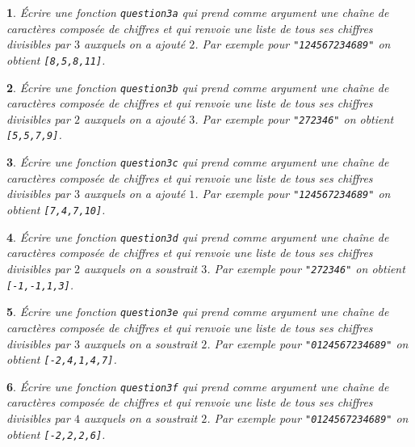 \documentclass[10pt]{article}
\newtheorem{exi}{}
\newenvironment{exo}{\begin{exi}\em}{\end{exi}}
\begin{document}
\vspace*{-2ex}
\begin{exo}
    Écrire une fonction {\tt question3a} qui prend comme argument une chaîne de
caractères composée de chiffres
et qui renvoie une liste de tous ses chiffres divisibles par $3$
auxquels on a ajouté $2$. Par
exemple pour \verb+"124567234689"+ on obtient \verb+[8,5,8,11]+.
\end{exo}
\vspace*{-2ex}
\begin{exo}
    Écrire une fonction {\tt question3b} qui prend comme argument une chaîne de
caractères composée de chiffres
et qui renvoie une liste de tous ses chiffres divisibles par $2$
auxquels on a ajouté $3$. Par
exemple pour \verb+"272346"+ on obtient \verb+[5,5,7,9]+.
\end{exo}
\vspace*{-2ex}
\begin{exo}
    Écrire une fonction {\tt question3c} qui prend comme argument une chaîne de
caractères composée de chiffres
et qui renvoie une liste de tous ses chiffres divisibles par $3$
auxquels on a ajouté $1$. Par
exemple pour \verb+"124567234689"+ on obtient \verb+[7,4,7,10]+.
\end{exo}
\vspace*{-2ex}
\begin{exo}
    Écrire une fonction {\tt question3d} qui prend comme argument une chaîne de
caractères composée de chiffres
et qui renvoie une liste de tous ses chiffres divisibles par $2$
auxquels on a soustrait $3$. Par
exemple pour \verb+"272346"+ on obtient \verb+[-1,-1,1,3]+.
\end{exo}
\vspace*{-2ex}
\begin{exo}
    Écrire une fonction {\tt question3e} qui prend comme argument une chaîne de
caractères composée de chiffres
et qui renvoie une liste de tous ses chiffres divisibles par $3$
auxquels on a soustrait $2$. Par
exemple pour \verb+"0124567234689"+ on obtient \verb+[-2,4,1,4,7]+.
\end{exo}
\vspace*{-2ex}
\begin{exo}
    Écrire une fonction {\tt question3f} qui prend comme argument une chaîne de
caractères composée de chiffres
et qui renvoie une liste de tous ses chiffres divisibles par $4$
auxquels on a soustrait $2$. Par
exemple pour \verb+"0124567234689"+ on obtient \verb+[-2,2,2,6]+.
\end{exo}
\end{document}
